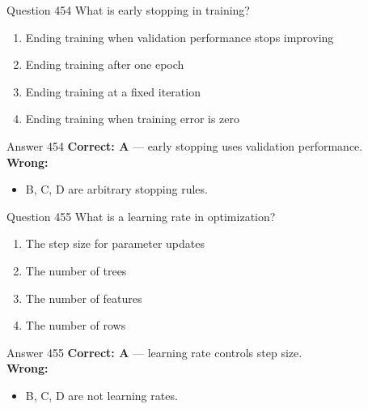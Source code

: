 \documentclass[aspectratio=169,11pt]{beamer}
\begin{document}
	\begin{frame}{Question 454}
		What is early stopping in training?
		\begin{enumerate}[label=\Alph*.]
			\item Ending training when validation performance stops improving
			\item Ending training after one epoch
			\item Ending training at a fixed iteration
			\item Ending training when training error is zero
		\end{enumerate}
	\end{frame}
	\begin{frame}{Answer 454}
		\textbf{Correct: A} --- early stopping uses validation performance.\\
		\vspace{0.5em}
		\textbf{Wrong:}
		\begin{itemize}
			\item B, C, D are arbitrary stopping rules.
		\end{itemize}
	\end{frame}
	
	\begin{frame}{Question 455}
		What is a learning rate in optimization?
		\begin{enumerate}[label=\Alph*.]
			\item The step size for parameter updates
			\item The number of trees
			\item The number of features
			\item The number of rows
		\end{enumerate}
	\end{frame}
	\begin{frame}{Answer 455}
		\textbf{Correct: A} --- learning rate controls step size.\\
		\vspace{0.5em}
		\textbf{Wrong:}
		\begin{itemize}
			\item B, C, D are not learning rates.
		\end{itemize}
	\end{frame}
	
\end{document}

